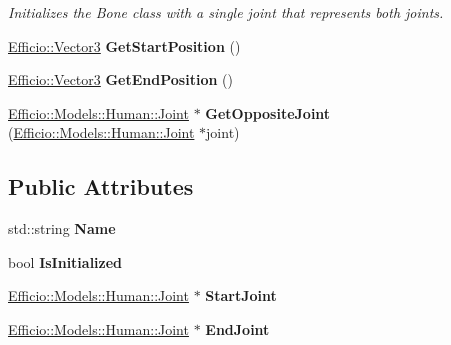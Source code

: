 \begin{DoxyCompactItemize}
\begin{DoxyCompactList}\small\item\em Initializes the Bone class with a single joint that represents both joints. \end{DoxyCompactList}\item 
\hyperlink{class_efficio_1_1_vector3}{Efficio\+::\+Vector3} {\bfseries Get\+Start\+Position} ()\hypertarget{class_efficio_1_1_models_1_1_human_1_1_bone2_a06f3763ea5a67145035d44dea03882bf}{}\label{class_efficio_1_1_models_1_1_human_1_1_bone2_a06f3763ea5a67145035d44dea03882bf}

\item 
\hyperlink{class_efficio_1_1_vector3}{Efficio\+::\+Vector3} {\bfseries Get\+End\+Position} ()\hypertarget{class_efficio_1_1_models_1_1_human_1_1_bone2_aab9a65ee5df7b143115b6e758c1a369f}{}\label{class_efficio_1_1_models_1_1_human_1_1_bone2_aab9a65ee5df7b143115b6e758c1a369f}

\item 
\hyperlink{class_efficio_1_1_models_1_1_human_1_1_joint}{Efficio\+::\+Models\+::\+Human\+::\+Joint} $\ast$ {\bfseries Get\+Opposite\+Joint} (\hyperlink{class_efficio_1_1_models_1_1_human_1_1_joint}{Efficio\+::\+Models\+::\+Human\+::\+Joint} $\ast$joint)\hypertarget{class_efficio_1_1_models_1_1_human_1_1_bone2_ace311132b089547cd567376a0e8d276e}{}\label{class_efficio_1_1_models_1_1_human_1_1_bone2_ace311132b089547cd567376a0e8d276e}

\end{DoxyCompactItemize}
\subsection*{Public Attributes}
\begin{DoxyCompactItemize}
\item 
std\+::string {\bfseries Name}\hypertarget{class_efficio_1_1_models_1_1_human_1_1_bone2_abdccdc8ff566790ebdadb1e100a4f69d}{}\label{class_efficio_1_1_models_1_1_human_1_1_bone2_abdccdc8ff566790ebdadb1e100a4f69d}

\item 
bool {\bfseries Is\+Initialized}\hypertarget{class_efficio_1_1_models_1_1_human_1_1_bone2_aa4cf663d57f083de43bf23c8559d1fbd}{}\label{class_efficio_1_1_models_1_1_human_1_1_bone2_aa4cf663d57f083de43bf23c8559d1fbd}

\item 
\hyperlink{class_efficio_1_1_models_1_1_human_1_1_joint}{Efficio\+::\+Models\+::\+Human\+::\+Joint} $\ast$ {\bfseries Start\+Joint}\hypertarget{class_efficio_1_1_models_1_1_human_1_1_bone2_a425aeafa8dfb0b59912f016c9f1ecb32}{}\label{class_efficio_1_1_models_1_1_human_1_1_bone2_a425aeafa8dfb0b59912f016c9f1ecb32}

\item 
\hyperlink{class_efficio_1_1_models_1_1_human_1_1_joint}{Efficio\+::\+Models\+::\+Human\+::\+Joint} $\ast$ {\bfseries End\+Joint}\hypertarget{class_efficio_1_1_models_1_1_human_1_1_bone2_ad03c14bbc295e9bf60030ca592539ee2}{}\label{class_efficio_1_1_models_1_1_human_1_1_bone2_ad03c14bbc295e9bf60030ca592539ee2}

\end{DoxyCompactItemize}


